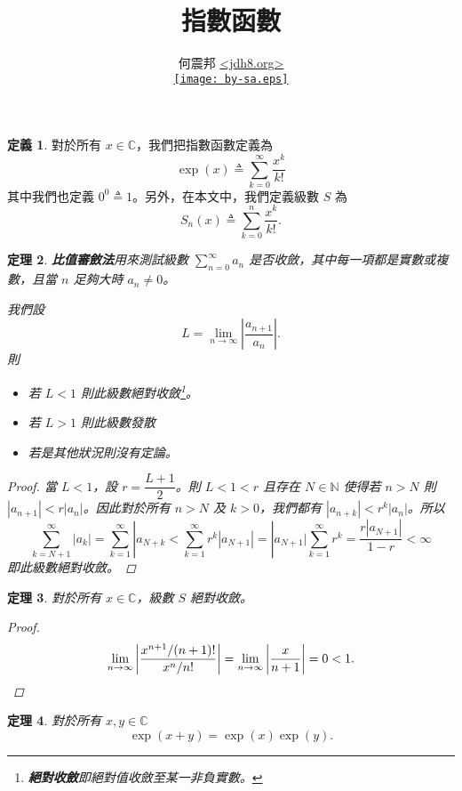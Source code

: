 \documentclass[a4paper]{article}
\title{指數函數}
\author{何震邦 \href{http://jdh8.org/}{\textless jdh8.org\textgreater}\\
    \href{http://creativecommons.org/licenses/by-sa/3.0/tw/deed.zh\textunderscore TW}{\texttt{[image: by-sa.eps]}}}
\newcommand  {\N}{\mathbb N}
\renewcommand{\C}{\mathbb C}
\theoremstyle{plain}
\newtheorem{theorem}{定理}
\theoremstyle{definition}
\newtheorem{definition}[theorem]{定義}
\theoremstyle{remark}
\begin{document}
\begin{CJK}{UTF8}{bsmi}
\maketitle

\begin{definition} \label{def:exp}
  對於所有 $x \in \C$，我們把指數函數定義為
  \[\exp(x) \triangleq \sum_{k=0}^{\infty} \frac{x^k}{k!}\]
  其中我們也定義 $0^0 \triangleq 1$。另外，在本文中，我們定義級數 $S$ 為
  \[S_n(x) \triangleq \sum_{k=0}^n \frac{x^k}{k!}.\]
\end{definition}

\begin{theorem}
  \textbf{比值審斂法}用來測試級數 $\displaystyle \sum_{n=0}^\infty a_n$ 是否收斂，其中每一項都是實數或複數，且當 $n$
  足夠大時 $a_n \ne 0$。

  我們設
  \[L = \lim_{n \to \infty} \left| \frac{a_{n+1}}{a_n} \right|.\]
  則
  \begin{itemize}
    \item 若 $L < 1$ 則此級數絕對收斂\footnote{\textbf{絕對收斂}即絕對值收斂至某一非負實數。}。
    \item 若 $L > 1$ 則此級數發散
    \item 若是其他狀況則沒有定論。
  \end{itemize}

  \begin{proof}
    當 $L < 1$，設 $r = \dfrac{L+1}{2}$。則 $L < 1 < r$ 且存在 $N \in \N$ 使得若 $n > N$ 則 $|a_{n+1}| < r \left| a_n
    \right|$。因此對於所有 $n > N$ 及 $k > 0$，我們都有 $|a_{n+k}| < r^k \left| a_n \right|$。所以
    \[\sum_{k=N+1}^\infty |a_k| = \sum_{k=1}^\infty |a_{N+k} < \sum_{k=1}^\infty r^k \left| a_{N+1} \right| = |a_{N+1}|
    \sum_{k=1}^\infty r^k = \frac{r \left| a_{N+1} \right|}{1-r} < \infty\]
    即此級數絕對收斂。
  \end{proof}
\end{theorem}

\begin{theorem}
  對於所有 $x \in \C$，級數 $S$ 絕對收斂。
  \begin{proof}
    \[\lim_{n \to \infty} \left| \frac{x^{n+1} / (n+1)!}{x^n / n!} \right| = \lim_{n \to \infty} \left| \frac{x}{n+1}
    \right| = 0 < 1. \qedhere\]
  \end{proof}
\end{theorem}

\begin{theorem}
  對於所有 $x,y \in \C$
  \[\exp(x+y) = \exp(x) \exp(y).\]


\end{theorem}
\end{CJK}
\end{document}
